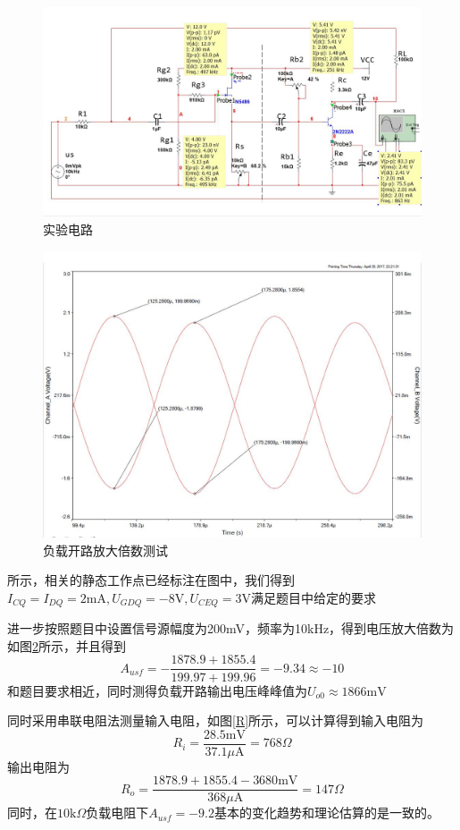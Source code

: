 \documentclass[UTF8,a4paper]{article}
\begin{document}
\begin{figure}
\centering
\includegraphics[width=\textwidth]{cir.jpg}
\caption{实验电路}
\label{ACT}
\end{figure}
\begin{figure}
\centering
\includegraphics[width=\textwidth]{A.jpg}
\caption{负载开路放大倍数测试}
\label{A}
\end{figure}
所示，相关的静态工作点已经标注在图中，我们得到$I_{CQ}=I_{DQ}=2\mathrm{mA},U_{GDQ}=-8\mathrm{V},U_{CEQ}=3\mathrm{V}$满足题目中给定的要求

进一步按照题目中设置信号源幅度为200mV，频率为10kHz，得到电压放大倍数为如图\ref{A}所示，并且得到
$$A_{usf}=-\frac{1878.9+1855.4}{199.97+199.96}=-9.34\approx -10$$
和题目要求相近，同时测得负载开路输出电压峰峰值为$U_{o0}\approx1866\mathrm{mV}$

同时采用串联电阻法测量输入电阻，如图\ref{R}所示，可以计算得到输入电阻为
$$R_i=\frac{28.5\mathrm{mV}}{37.1\mu\mathrm{A}}=768\Omega$$
输出电阻为$$R_o=\frac{1878.9+1855.4-3680\mathrm{mV}}{368\mu\mathrm{A}}=147\Omega$$
同时，在$10\mathrm{k}\Omega$负载电阻下$A_{usf}=-9.2$基本的变化趋势和理论估算的是一致的。
\end{document}
